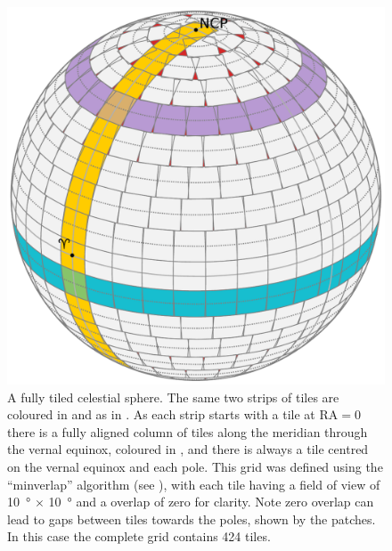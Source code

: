 \begin{colsection}
\begin{figure}[t]
    \begin{center}
        \includegraphics[width=\linewidth]{images/globe4.pdf}
    \end{center}
    \caption[A fully tiled celestial sphere]{
        A fully tiled celestial sphere. The same two strips of tiles are coloured in  and  as in . As each strip starts with a tile at RA$=0$ there is a fully aligned column of tiles along the meridian through the vernal equinox, coloured in , and there is always a tile centred on the vernal equinox and each pole. This grid was defined using the ``minverlap'' algorithm (see ), with each tile having a field of view of \SI{10}{\degree} $\times$ \SI{10}{\degree} and a overlap of zero for clarity. Note zero overlap can lead to gaps between tiles towards the poles, shown by the  patches. In this case the complete grid contains 424 tiles.
    }\label{fig:tiledsphere}
\end{figure}

\clearpage

\makeatletter
\setlength{\@fptop}{0\p@ \@plus 1fil} %
\makeatother

\end{colsection}

